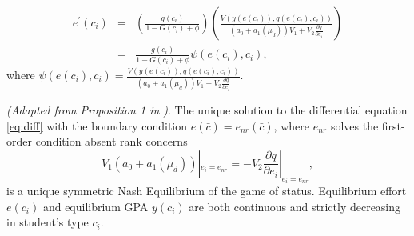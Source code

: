 \begin{eqnarray}\label{eq:diff}
    e^{\prime}(c_i)&=& \left(\frac{g(c_i)}{1-G(c_i)+\phi}\right)\left(\frac{V(y(e(c_i)),q(e(c_i),c_i))}{(a_0+a_1(\mu_d))V_1+V_2 \frac{\partial q}{\partial e_i}}\right) \\ \nonumber
    &=& \frac{g(c_i)}{1-G(c_i)+\phi}\psi(e(c_i),c_i),
\end{eqnarray}
\noindent where $\psi(e(c_i),c_i)=\frac{V(y(e(c_i)),q(e(c_i),c_i))}{(a_0+a_1(\mu_d))V_1+V_2 \frac{\partial q}{\partial e_i}}.$



 \begin{proposition}\label{prop1existence}
    \emph{(Adapted from Proposition 1 in \cite{hopkins2004running})}. 
    The unique solution to the differential equation \eqref{eq:diff} with the boundary condition $e(\bar{c})=e_{nr}(\bar{c})$, where $e_{nr}$ solves the first-order condition absent rank concerns $$V_1 (a_0+a_1(\mu_d))|_{e_i=e_{nr}}=-V_2\frac{\partial q}{\partial e_i}|_{e_i=e_{nr}},$$ is a unique symmetric Nash Equilibrium of the game of status. Equilibrium effort $e(c_i)$ and equilibrium GPA $y(c_i)$ are both continuous and strictly decreasing in student's type $c_i$.
\end{proposition}


